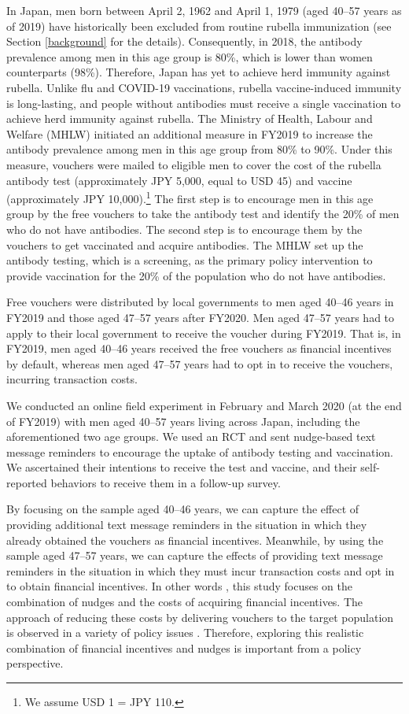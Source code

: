 \documentclass[
      12pt,
    a4paper
]{article}
\begin{document}
In Japan, men born between April 2, 1962 and April 1, 1979 (aged 40--57 years as of 2019) have historically been excluded from routine rubella immunization (see Section \ref{background} for the details). Consequently, in 2018, the antibody prevalence among men in this age group is 80\%, which is lower than women counterparts (98\%). Therefore, Japan has yet to achieve herd immunity against rubella. Unlike flu and COVID-19 vaccinations, rubella vaccine-induced immunity is long-lasting, and people without antibodies must receive a single vaccination to achieve herd immunity against rubella. The Ministry of Health, Labour and Welfare (MHLW) initiated an additional measure in FY2019 to increase the antibody prevalence among men in this age group from 80\% to 90\%. Under this measure, vouchers were mailed to eligible men to cover the cost of the rubella antibody test (approximately JPY 5,000, equal to USD 45) and vaccine (approximately JPY 10,000).\footnote{We assume USD 1 = JPY 110.} The first step is to encourage men in this age group by the free vouchers to take the antibody test and identify the 20\% of men who do not have antibodies. The second step is to encourage them by the vouchers to get vaccinated and acquire antibodies. The MHLW set up the antibody testing, which is a screening, as the primary policy intervention to provide vaccination for the 20\% of the population who do not have antibodies.

Free vouchers were distributed by local governments to men aged 40--46 years in FY2019 and those aged 47--57 years after FY2020. Men aged 47--57 years had to apply to their local government to receive the voucher during FY2019. That is, in FY2019, men aged 40--46 years received the free vouchers as financial incentives by default, whereas men aged 47--57 years had to opt in to receive the vouchers, incurring transaction costs.

We conducted an online field experiment in February and March 2020 (at the end of FY2019) with men aged 40--57 years living across Japan, including the aforementioned two age groups. We used an RCT and sent nudge-based text message reminders to encourage the uptake of antibody testing and vaccination. We ascertained their intentions to receive the test and vaccine, and their self-reported behaviors to receive them in a follow-up survey.

By focusing on the sample aged 40--46 years, we can capture the effect of providing additional text message reminders in the situation in which they already obtained the vouchers as financial incentives. Meanwhile, by using the sample aged 47--57 years, we can capture the effects of providing text message reminders in the situation in which they must incur transaction costs and opt in to obtain financial incentives. In other words , this study focuses on the combination of nudges and the costs of acquiring financial incentives. The approach of reducing these costs by delivering vouchers to the target population is observed in a variety of policy issues \citep[e.g.,][]{Ahmed2011, Kacker2022}. Therefore, exploring this realistic combination of financial incentives and nudges is important from a policy perspective.
\end{document}
